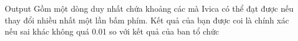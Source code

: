 Output  
Gồm một dòng duy nhất chứa khoảng các mà Ivica có thể đạt được nếu thay đổi nhiều nhất một lần bấm phím. Kết quả của bạn được coi là chính xác nếu sai khác không quá 0.01 so với kết quả của ban tổ chức